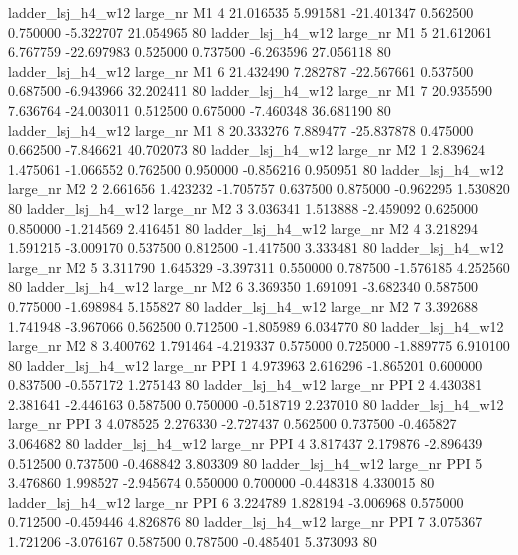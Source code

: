   ladder_lsj_h4_w12   large_nr       M1                 4 21.016535  5.991581 -21.401347 0.562500 0.750000 -5.322707   21.054965 80
  ladder_lsj_h4_w12   large_nr       M1                 5 21.612061  6.767759 -22.697983 0.525000 0.737500 -6.263596   27.056118 80
  ladder_lsj_h4_w12   large_nr       M1                 6 21.432490  7.282787 -22.567661 0.537500 0.687500 -6.943966   32.202411 80
  ladder_lsj_h4_w12   large_nr       M1                 7 20.935590  7.636764 -24.003011 0.512500 0.675000 -7.460348   36.681190 80
  ladder_lsj_h4_w12   large_nr       M1                 8 20.333276  7.889477 -25.837878 0.475000 0.662500 -7.846621   40.702073 80
  ladder_lsj_h4_w12   large_nr       M2                 1  2.839624  1.475061  -1.066552 0.762500 0.950000 -0.856216    0.950951 80
  ladder_lsj_h4_w12   large_nr       M2                 2  2.661656  1.423232  -1.705757 0.637500 0.875000 -0.962295    1.530820 80
  ladder_lsj_h4_w12   large_nr       M2                 3  3.036341  1.513888  -2.459092 0.625000 0.850000 -1.214569    2.416451 80
  ladder_lsj_h4_w12   large_nr       M2                 4  3.218294  1.591215  -3.009170 0.537500 0.812500 -1.417500    3.333481 80
  ladder_lsj_h4_w12   large_nr       M2                 5  3.311790  1.645329  -3.397311 0.550000 0.787500 -1.576185    4.252560 80
  ladder_lsj_h4_w12   large_nr       M2                 6  3.369350  1.691091  -3.682340 0.587500 0.775000 -1.698984    5.155827 80
  ladder_lsj_h4_w12   large_nr       M2                 7  3.392688  1.741948  -3.967066 0.562500 0.712500 -1.805989    6.034770 80
  ladder_lsj_h4_w12   large_nr       M2                 8  3.400762  1.791464  -4.219337 0.575000 0.725000 -1.889775    6.910100 80
  ladder_lsj_h4_w12   large_nr      PPI                 1  4.973963  2.616296  -1.865201 0.600000 0.837500 -0.557172    1.275143 80
  ladder_lsj_h4_w12   large_nr      PPI                 2  4.430381  2.381641  -2.446163 0.587500 0.750000 -0.518719    2.237010 80
  ladder_lsj_h4_w12   large_nr      PPI                 3  4.078525  2.276330  -2.727437 0.562500 0.737500 -0.465827    3.064682 80
  ladder_lsj_h4_w12   large_nr      PPI                 4  3.817437  2.179876  -2.896439 0.512500 0.737500 -0.468842    3.803309 80
  ladder_lsj_h4_w12   large_nr      PPI                 5  3.476860  1.998527  -2.945674 0.550000 0.700000 -0.448318    4.330015 80
  ladder_lsj_h4_w12   large_nr      PPI                 6  3.224789  1.828194  -3.006968 0.575000 0.712500 -0.459446    4.826876 80
  ladder_lsj_h4_w12   large_nr      PPI                 7  3.075367  1.721206  -3.076167 0.587500 0.787500 -0.485401    5.373093 80
